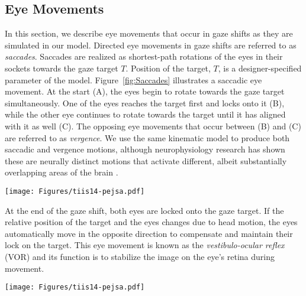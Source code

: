 \subsection{Eye Movements}

In this section, we describe eye movements that occur in gaze shifts as they are simulated in our model. Directed eye movements in gaze shifts are referred to as \emph{saccades}. Saccades are realized as shortest-path rotations of the eyes in their sockets towards the gaze target $T$. Position of the target, $T$, is a designer-specified parameter of the model. Figure~\ref{fig:Saccades} illustrates a saccadic eye movement. At the start (A), the eyes begin to rotate towards the gaze target simultaneously. One of the eyes reaches the target first and locks onto it (B), while the other eye continues to rotate towards the target until it has aligned with it as well (C). The opposing eye movements that occur between (B) and (C) are referred to as \emph{vergence}. We use the same kinematic model to produce both saccadic and vergence motions, although neurophysiology research has shown these are neurally distinct motions that activate different, albeit substantially overlapping areas of the brain \cite{alkan2011differentiation}.

\begin{figure*}[b]
\centering
\texttt{[image: Figures/tiis14-pejsa.pdf]}
\caption{Phases of an eye saccade. Dashed arrows indicate eye gaze directions, while the curved arrow indicates the direction of the rotational movement. Saccade proceeds as follows: (A) Eyes begin to rotate towards the target. (B) First eye has reached the target. (C) Both eyes have reached the target.}
\label{fig:Saccades}
\end{figure*}

At the end of the gaze shift, both eyes are locked onto the gaze target. If the relative position of the target and the eyes changes due to head motion, the eyes automatically move in the opposite direction to compensate and maintain their lock on the target. This eye movement is known as the \emph{vestibulo-ocular reflex} (VOR) and its function is to stabilize the image on the eye's retina during movement.

\begin{figure*}[t]
\centering
\texttt{[image: Figures/tiis14-pejsa.pdf]}
\caption{Velocity profiles for the motion of different body parts. Left: Eye velocity. Right: Head and trunk velocities. Mathematical expressions for the profiles are given in equations~\ref{eq:EyeVelocity} and~\ref{eq:HeadTrunkVelocity}.}
\label{fig:VelocityProfile}
\end{figure*}

